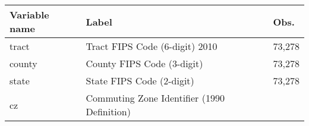 \documentclass[]{book}
\begin{document}
\begin{longtable}[]{@{}lll@{}}
\toprule
\begin{minipage}[b]{0.04\columnwidth}\raggedright\strut
Variable name\strut
\end{minipage} & \begin{minipage}[b]{0.04\columnwidth}\raggedright\strut
Label\strut
\end{minipage} & \begin{minipage}[b]{0.04\columnwidth}\raggedright\strut
Obs.\strut
\end{minipage}\tabularnewline
\midrule
\endhead
\begin{minipage}[t]{0.04\columnwidth}\raggedright\strut
tract\strut
\end{minipage} & \begin{minipage}[t]{0.04\columnwidth}\raggedright\strut
Tract FIPS Code (6-digit) 2010\strut
\end{minipage} & \begin{minipage}[t]{0.04\columnwidth}\raggedright\strut
73,278\strut
\end{minipage}\tabularnewline
\begin{minipage}[t]{0.04\columnwidth}\raggedright\strut
county\strut
\end{minipage} & \begin{minipage}[t]{0.04\columnwidth}\raggedright\strut
County FIPS Code (3-digit)\strut
\end{minipage} & \begin{minipage}[t]{0.04\columnwidth}\raggedright\strut
73,278\strut
\end{minipage}\tabularnewline
\begin{minipage}[t]{0.04\columnwidth}\raggedright\strut
state\strut
\end{minipage} & \begin{minipage}[t]{0.04\columnwidth}\raggedright\strut
State FIPS Code (2-digit)\strut
\end{minipage} & \begin{minipage}[t]{0.04\columnwidth}\raggedright\strut
73,278\strut
\end{minipage}\tabularnewline
\begin{minipage}[t]{0.04\columnwidth}\raggedright\strut
cz\strut
\end{minipage} & \begin{minipage}[t]{0.04\columnwidth}\raggedright\strut
Commuting Zone Identifier (1990 Definition)\strut
\end{minipage} & \begin{minipage}[t]{0.04\columnwidth}\raggedright\strut

\end{minipage}
\end{longtable}
\end{document}
